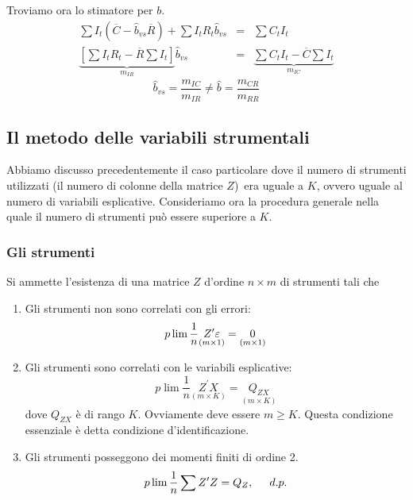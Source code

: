 \documentclass[a4paper]{report}
\theoremstyle{remark}
\begin{document}
Troviamo ora lo stimatore per $b$.%
\begin{eqnarray*}
\sum I_{t}(\overline{C}-\widehat{b}_{vs}\overline{R})+\sum I_{t}R_{t}%
\widehat{b}_{vs} &=&\sum C_{t}I_{t} \\
\underset{m_{IR}}{\underbrace{\left[ \sum I_{t}R_{t}-\overline{R}\sum I_{t}%
\right] }}\widehat{b}_{vs} &=&\underset{m_{IC}}{\underbrace{\sum C_{t}I_{t}-%
\overline{C}\sum I_{t}}}
\end{eqnarray*}%
\begin{equation*}
\widehat{b}_{vs}=\frac{m_{IC}}{m_{IR}}\neq \widehat{b}=\frac{m_{CR}}{m_{RR}}
\end{equation*}

\subsection{Il metodo delle variabili strumentali}

Abbiamo discusso precedentemente il caso particolare dove il numero di
strumenti utilizzati (il numero di colonne della matrice $Z$)\ era uguale a $%
K$, ovvero uguale al numero di variabili esplicative. {Consideriamo ora la
procedura generale nella quale il numero di strumenti pu\`{o} essere
superiore a }$K$.

\subsubsection{Gli strumenti}

Si ammette l'esistenza di una matrice $Z$ d'ordine $n\times m$ di strumenti
tali che

\begin{enumerate}
\item Gli strumenti non sono correlati con gli errori: 
\begin{equation*}
p\lim \frac{1}{n}\underset{(m\times 1)}{{Z^{\prime }\varepsilon }}=\underset{%
(m\times 1)}{0}
\end{equation*}

\item Gli strumenti sono correlati con le variabili esplicative: 
\begin{equation*}
p\lim \frac{1}{n}\underset{(m\times K)}{{Z^{\prime }X}}=\underset{(m\times K)%
}{Q_{ZX}}
\end{equation*}%
dove $Q_{ZX}$ \`{e} di rango $K$. Ovviamente deve essere $m\geq K$. Questa
condizione essenziale \`{e} detta condizione d'identificazione.

\item Gli strumenti posseggono dei momenti finiti di ordine 2. 
\begin{equation*}
p\lim \frac{1}{n}\sum {Z^{\prime }Z}=Q_{Z},\hspace{0.5cm}d.p.
\end{equation*}
\end{enumerate}
\end{document}
